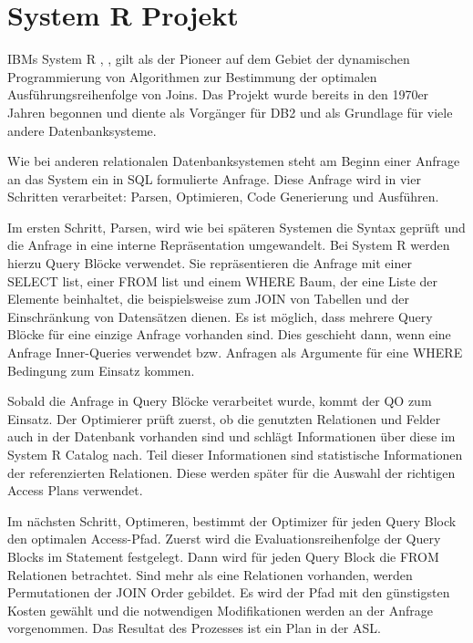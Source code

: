\section{System R Projekt}

IBMs System R \cite{selinger1979access}, \cite{wade2012ibm}, \cite{chamberlin1981history} gilt als der Pioneer auf dem Gebiet der dynamischen Programmierung von Algorithmen zur Bestimmung der optimalen Ausführungsreihenfolge von Joins. Das Projekt wurde bereits in den 1970er Jahren begonnen und diente als Vorgänger für DB2 und als Grundlage für viele andere Datenbanksysteme.

Wie bei anderen relationalen Datenbanksystemen steht am Beginn einer Anfrage an das System ein in \ac{SQL} formulierte Anfrage. Diese Anfrage wird in vier Schritten verarbeitet: Parsen,  Optimieren, Code Generierung und Ausführen.

Im ersten Schritt, Parsen, wird wie bei späteren Systemen die Syntax geprüft und die Anfrage in eine interne Repräsentation umgewandelt. Bei System R werden hierzu Query Blöcke verwendet. Sie repräsentieren die Anfrage mit einer SELECT list, einer FROM list und einem WHERE Baum, der eine Liste der Elemente beinhaltet, die beispielsweise zum JOIN von Tabellen und der Einschränkung von Datensätzen dienen. Es ist möglich, dass mehrere Query Blöcke für eine einzige Anfrage vorhanden sind. Dies geschieht dann, wenn eine Anfrage Inner-Queries verwendet bzw. Anfragen als Argumente für eine WHERE Bedingung zum Einsatz kommen.


Sobald die Anfrage in Query Blöcke verarbeitet wurde, kommt der \ac{QO} zum Einsatz. Der Optimierer prüft zuerst, ob die genutzten Relationen und Felder auch in der Datenbank vorhanden sind und schlägt Informationen über diese im System R Catalog nach. Teil dieser Informationen sind statistische Informationen der referenzierten Relationen. Diese werden später für die Auswahl der richtigen Access Plans verwendet.

Im nächsten Schritt, Optimeren, bestimmt der Optimizer für jeden Query Block den optimalen Access-Pfad. Zuerst wird die Evaluationsreihenfolge der Query Blocks im Statement festgelegt. Dann wird für jeden Query Block die FROM Relationen betrachtet. Sind mehr als eine Relationen vorhanden, werden Permutationen der JOIN Order gebildet. Es wird der Pfad mit den günstigsten Kosten gewählt und die notwendigen Modifikationen werden an der Anfrage vorgenommen. Das Resultat des Prozesses ist ein Plan in der \ac{ASL}.

